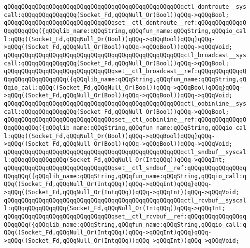 \newline
\verb|qQQqqQQqqQQqqQQqqQQqqQQqqQQqqQQqqQQqqQQqqQQqqQQqqQQqctl_dontroute__syscall:qQQqqQQqqQQqqQQq(Socket_Fd,qQQqNull_Or(Bool))qQQq->qQQqBool;|\newline
\verb|qQQqqQQqqQQqqQQqqQQqqQQqqQQqqQQqset__ctl_dontroute__ref:qQQqqQQqqQQqqQQqqQQqqQQq({qQQqlib_name:qQQqString,qQQqfun_name:qQQqString,qQQqio_call:qQQq((Socket_Fd,qQQqNull_Or(Bool))qQQq->qQQqBool)qQQq}qQQq->qQQq((Socket_Fd,qQQqNull_Or(Bool))qQQq->qQQqBool))qQQq->qQQqVoid;|\newline
\newline
\verb|qQQqqQQqqQQqqQQqqQQqqQQqqQQqqQQqqQQqqQQqqQQqqQQqqQQqctl_broadcast__syscall:qQQqqQQqqQQqqQQq(Socket_Fd,qQQqNull_Or(Bool))qQQq->qQQqBool;|\newline
\verb|qQQqqQQqqQQqqQQqqQQqqQQqqQQqqQQqset__ctl_broadcast__ref:qQQqqQQqqQQqqQQqqQQqqQQqqQQqqQQq({qQQqlib_name:qQQqString,qQQqfun_name:qQQqString,qQQqio_call:qQQq((Socket_Fd,qQQqNull_Or(Bool))qQQq->qQQqBool)qQQq}qQQq->qQQq((Socket_Fd,qQQqNull_Or(Bool))qQQq->qQQqBool))qQQq->qQQqVoid;|\newline
\newline
\verb|qQQqqQQqqQQqqQQqqQQqqQQqqQQqqQQqqQQqqQQqqQQqqQQqqQQqctl_oobinline__syscall:qQQqqQQqqQQqqQQq(Socket_Fd,qQQqNull_Or(Bool))qQQq->qQQqBool;|\newline
\verb|qQQqqQQqqQQqqQQqqQQqqQQqqQQqqQQqset__ctl_oobinline__ref:qQQqqQQqqQQqqQQqqQQqqQQq({qQQqlib_name:qQQqString,qQQqfun_name:qQQqString,qQQqio_call:qQQq((Socket_Fd,qQQqNull_Or(Bool))qQQq->qQQqBool)qQQq}qQQq->qQQq((Socket_Fd,qQQqNull_Or(Bool))qQQq->qQQqBool))qQQq->qQQqVoid;|\newline
\newline
\verb|qQQqqQQqqQQqqQQqqQQqqQQqqQQqqQQqqQQqqQQqqQQqqQQqqQQqctl_sndbuf__syscall:qQQqqQQqqQQqqQQq(Socket_Fd,qQQqNull_Or(IntqQQq))qQQq->qQQqInt;|\newline
\verb|qQQqqQQqqQQqqQQqqQQqqQQqqQQqqQQqset__ctl_sndbuf__ref:qQQqqQQqqQQqqQQqqQQqqQQq({qQQqlib_name:qQQqString,qQQqfun_name:qQQqString,qQQqio_call:qQQq((Socket_Fd,qQQqNull_Or(IntqQQq))qQQq->qQQqInt)qQQq}qQQq->qQQq((Socket_Fd,qQQqNull_Or(IntqQQq))qQQq->qQQqInt))qQQq->qQQqVoid;|\newline
\newline
\verb|qQQqqQQqqQQqqQQqqQQqqQQqqQQqqQQqqQQqqQQqqQQqqQQqqQQqctl_rcvbuf__syscall:qQQqqQQqqQQqqQQq(Socket_Fd,qQQqNull_Or(IntqQQq))qQQq->qQQqInt;|\newline
\verb|qQQqqQQqqQQqqQQqqQQqqQQqqQQqqQQqset__ctl_rcvbuf__ref:qQQqqQQqqQQqqQQqqQQqqQQq({qQQqlib_name:qQQqString,qQQqfun_name:qQQqString,qQQqio_call:qQQq((Socket_Fd,qQQqNull_Or(IntqQQq))qQQq->qQQqInt)qQQq}qQQq->qQQq((Socket_Fd,qQQqNull_Or(IntqQQq))qQQq->qQQqInt))qQQq->qQQqVoid;|\newline
